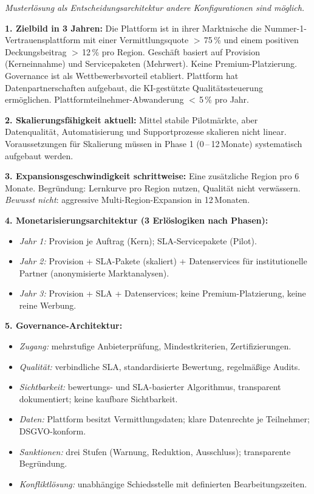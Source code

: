 \documentclass[11pt,a4paper,oneside]{article}
\begin{document}
\begin{loesungbox}
\emph{Musterlösung als Entscheidungsarchitektur \textendash{} andere Konfigurationen sind möglich.}

\smallskip
\textbf{1. Zielbild in 3 Jahren:}
Die Plattform ist in ihrer Marktnische die Nummer-1-Vertrauensplattform mit einer Vermittlungsquote $>$\,75\,\% und einem positiven Deckungsbeitrag $>$\,12\,\% pro Region. Geschäft basiert auf Provision (Kerneinnahme) und Servicepaketen (Mehrwert). Keine Premium-Platzierung. Governance ist als Wettbewerbsvorteil etabliert. Plattform hat Datenpartnerschaften aufgebaut, die KI-gestützte Qualitätssteuerung ermöglichen. Plattformteilnehmer-Abwanderung $<$\,5\,\% pro Jahr.

\textbf{2. Skalierungsfähigkeit aktuell:}
Mittel \textendash{} stabile Pilotmärkte, aber Datenqualität, Automatisierung und Supportprozesse skalieren nicht linear. Voraussetzungen für Skalierung müssen in Phase 1 (0\,--\,12\,Monate) systematisch aufgebaut werden.

\textbf{3. Expansionsgeschwindigkeit \textendash{} schrittweise:}
Eine zusätzliche Region pro 6 Monate. Begründung: Lernkurve pro Region nutzen, Qualität nicht verwässern. \emph{Bewusst nicht}: aggressive Multi-Region-Expansion in 12\,Monaten.

\textbf{4. Monetarisierungsarchitektur (3 Erlöslogiken nach Phasen):}
\begin{itemize}
  \item \emph{Jahr 1:} Provision je Auftrag (Kern); SLA-Servicepakete (Pilot).
  \item \emph{Jahr 2:} Provision + SLA-Pakete (skaliert) + Datenservices für institutionelle Partner (anonymisierte Marktanalysen).
  \item \emph{Jahr 3:} Provision + SLA + Datenservices; keine Premium-Platzierung, keine reine Werbung.
\end{itemize}

\textbf{5. Governance-Architektur:}
\begin{itemize}
  \item \emph{Zugang:} mehrstufige Anbieterprüfung, Mindestkriterien, Zertifizierungen.
  \item \emph{Qualität:} verbindliche SLA, standardisierte Bewertung, regelmäßige Audits.
  \item \emph{Sichtbarkeit:} bewertungs- und SLA-basierter Algorithmus, transparent dokumentiert; keine kaufbare Sichtbarkeit.
  \item \emph{Daten:} Plattform besitzt Vermittlungsdaten; klare Datenrechte je Teilnehmer; DSGVO-konform.
  \item \emph{Sanktionen:} drei Stufen (Warnung, Reduktion, Ausschluss); transparente Begründung.
  \item \emph{Konfliktlösung:} unabhängige Schiedsstelle mit definierten Bearbeitungszeiten.
\end{itemize}


\end{loesungbox}
\end{document}
